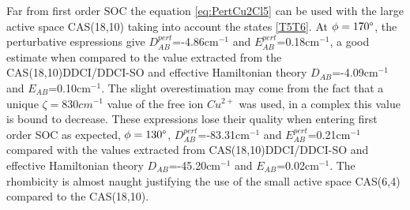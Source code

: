 \documentclass[10pt]{report}
\numberwithin{equation}{section}
\begin{document}
Far from first order SOC the equation \ref{eq:PertCu2Cl5} can be used with the large active space CAS(18,10) taking into account the states \ref{T5T6}.
At $\phi=170\degree$, the perturbative espressions give $D_{AB}^{pert}$=-4.86cm$^{-1}$ and $E_{AB}^{pert}$=0.18cm$^{-1}$, a good estimate when compared to the value extracted from the CAS(18,10)DDCI/DDCI-SO and effective Hamiltonian theory $D_{AB}$=-4.09cm$^{-1}$ and $E_{AB}$=0.10cm$^{-1}$.
The slight overestimation may come from the fact that a unique $\zeta=830cm^{-1}$ value of the free ion $Cu^{2+}$ was used, in a complex this value is bound to decrease.
These expressions lose their quality when entering first order SOC as expected, $\phi=130\degree$, $D_{AB}^{pert}$=-83.31cm$^{-1}$ and $E_{AB}^{pert}$=0.21cm$^{-1}$ compared with the values extracted from CAS(18,10)DDCI/DDCI-SO and effective Hamiltonian theory $D_{AB}$=-45.20cm$^{-1}$ and $E_{AB}$=0.02cm$^{-1}$.
The rhombicity is almost naught justifying the use of the small active space CAS(6,4) compared to the CAS(18,10).
\end{document}
